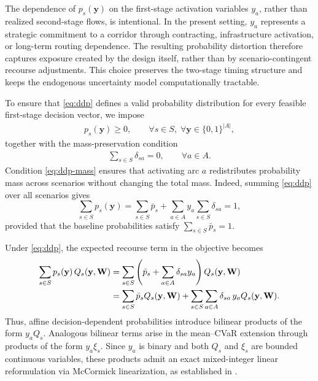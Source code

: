 \documentclass[final,3p,authoryear]{elsarticle}
\theoremstyle{definition}
\begin{document}
The dependence of $p_s(\mathbf y)$ on the first-stage activation variables
$y_a$, rather than realized second-stage flows, is intentional. In the present
setting, $y_a$ represents a strategic commitment to a corridor through
contracting, infrastructure activation, or long-term routing dependence. The
resulting probability distortion therefore captures exposure created by the
design itself, rather than by scenario-contingent recourse adjustments. This
choice preserves the two-stage timing structure and keeps the endogenous
uncertainty model computationally tractable.


To ensure that \eqref{eq:ddp} defines a valid probability distribution for
every feasible first-stage decision vector, we impose
\begin{align}
p_s(\mathbf y) \ge 0,
\qquad \forall s \in S,\; \forall \mathbf y \in \{0,1\}^{|A|},
\label{eq:ddp-nonneg}
\end{align}
together with the mass-preservation condition
\begin{align}
\sum_{s \in S} \delta_{sa} = 0,
\qquad \forall a \in A.
\label{eq:ddp-mass}
\end{align}
Condition \eqref{eq:ddp-mass} ensures that activating arc $a$ redistributes
probability mass across scenarios without changing the total mass. Indeed,
summing \eqref{eq:ddp} over all scenarios gives
\[
\sum_{s \in S} p_s(\mathbf y)
=
\sum_{s \in S} \bar p_s
+
\sum_{a \in A} y_a \sum_{s \in S} \delta_{sa}
=
1,
\]
provided that the baseline probabilities satisfy
$\sum_{s \in S} \bar p_s = 1$.

Under \eqref{eq:ddp}, the expected recourse term in the objective becomes
\begin{align}
\sum_{s \in S} p_s(\mathbf y)\, Q_s(\mathbf y,\mathbf W)
&=
\sum_{s \in S}
\left(
\bar p_s + \sum_{a \in A} \delta_{sa} y_a
\right) Q_s(\mathbf y,\mathbf W) \notag \\
&=
\sum_{s \in S} \bar p_s Q_s(\mathbf y,\mathbf W)
+
\sum_{s \in S}\sum_{a \in A} \delta_{sa}\, y_a Q_s(\mathbf y,\mathbf W).
\label{eq:ddp-expand}
\end{align}
Thus, affine decision-dependent probabilities introduce bilinear products
of the form $y_a Q_s$. Analogous bilinear terms arise in the mean--CVaR
extension through products of the form $y_a \xi_s$. Since $y_a$ is binary
and both $Q_s$ and $\xi_s$ are bounded continuous variables, these
products admit an exact mixed-integer linear reformulation via McCormick
linearization, as established in .
\end{document}

